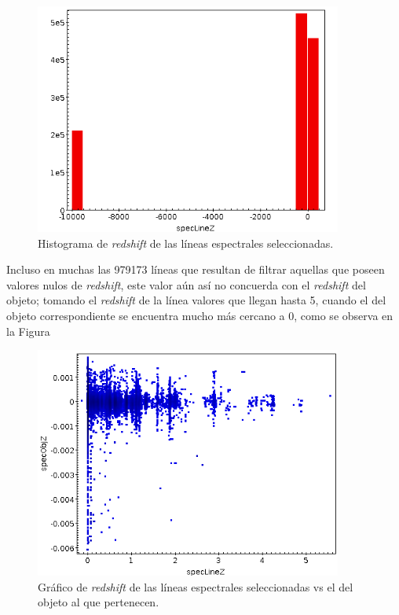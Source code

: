\begin{figure}[h!]
\begin{center}
\includegraphics[width=0.9\textwidth]{imagenes/speclinez_hist.png}
\end{center}
\vspace*{-5mm}
\caption{Histograma de \textit{redshift} de las líneas espectrales seleccionadas.}
\label{fig:speclinez_hist}
\end{figure}

Incluso en muchas las 979173 líneas que resultan de filtrar aquellas que poseen valores nulos de \textit{redshift}, este valor aún así no concuerda con el \textit{redshift} del objeto; tomando el \textit{redshift} de la línea valores que llegan hasta 5, cuando el del objeto correspondiente se encuentra mucho más cercano a 0, como se observa en la Figura \label{fig:specobjz_vs_speclinez}

\begin{figure}[h!]
\begin{center}
\includegraphics[width=0.9\textwidth]{imagenes/specobjz_vs_speclinez.png}
\end{center}
\vspace*{-5mm}
\caption{Gráfico de \textit{redshift} de las líneas espectrales seleccionadas vs el del objeto al que pertenecen.}
\label{fig:specobjz_vs_speclinez}
\end{figure}

